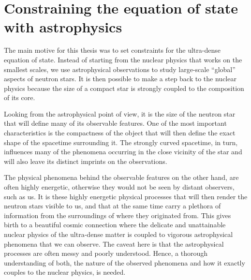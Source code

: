 \chapter{Constraining the equation of state with astrophysics}


The main motive for this thesis was to set constraints for the ultra-dense equation of state.
Instead of starting from the nuclear physics that works on the smallest scales, we use astrophysical observations to study large-scale ``global'' aspects of neutron stars.
It is then possible to make a step back to the nuclear physics because the size of a compact star is strongly coupled to the composition of its core.

Looking from the astrophysical point of view, it is the size of the neutron star that will define many of its observable features.
One of the most important characteristics is the compactness of the object that will then define the exact shape of the spacetime surrounding it.
The strongly curved spacetime, in turn, influences many of the phenomena occurring in the close vicinity of the star and will also leave its distinct imprints on the observations.

The physical phenomena behind the observable features on the other hand, are often highly energetic, otherwise they would not be seen by distant observers, such as us.
It is these highly energetic physical processes that will then render the neutron stars visible to us, and that at the same time carry a plethora of information from the surroundings of where they originated from.
This gives birth to a beautiful cosmic connection where the delicate and unattainable nuclear physics of the ultra-dense matter is coupled to vigorous astrophysical phenomena that we can observe.
The caveat here is that the astrophysical processes are often messy and poorly understood.
Hence, a thorough understanding of both, the nature of the observed phenomena and how it exactly couples to the nuclear physics, is needed.

